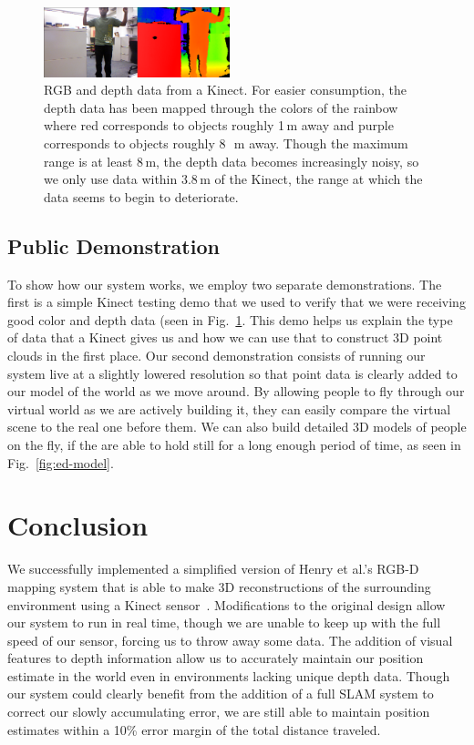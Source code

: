 \documentclass[letterpaper, 10pt, conference]{ieeeconf}
\begin{document}
\begin{figure}
\centering
\includegraphics[width=0.48\textwidth]{figures/KinectDemo.png}
\caption{RGB and depth data from a Kinect. For easier consumption, the depth
data has been mapped through the colors of the rainbow where red corresponds
to objects roughly 1\,m away and purple corresponds to objects roughly 8~\,m
away. Though the maximum range is at least 8\,m, the depth data
becomes increasingly noisy, so we only use data within 3.8\,m of the Kinect,
the range at which the data seems to begin to deteriorate.}
\label{fig:kinect-demo}
\end{figure}

\subsection{Public Demonstration}
To show how our system works, we employ two separate demonstrations. The first
is a simple Kinect testing demo that we used to verify that we were receiving
good color and depth data (seen in Fig.~\ref{fig:kinect-demo}. This demo helps
us explain the type of data that a Kinect gives us and how we can use that to
construct 3D point clouds in the first place. Our second demonstration
consists of running our system live at a slightly lowered resolution so that
point data is clearly added to our model of the world as we move around. By
allowing people to fly through our virtual world as we are actively building
it, they can easily compare the virtual scene to the real one before them. We
can also build detailed 3D models of people on the fly, if the are able to
hold still for a long enough period of time, as seen in Fig.~\ref{fig:ed-model}.

\section{Conclusion}
We successfully implemented a simplified version of Henry et al.'s RGB-D mapping
system that is able to make 3D reconstructions of the surrounding environment
using a Kinect sensor~\cite{Henry2010rgbd}. Modifications to the original
design allow our system to run in real time, though we are unable to keep up with
the full speed of our sensor, forcing us to throw away some data. The addition of
visual features to depth information allow us to accurately maintain our position
estimate in the world even in environments lacking unique depth data. Though our
system could clearly benefit from the addition of a full SLAM system to
correct our slowly accumulating error, we are still able to maintain position
estimates within a 10\% error margin of the total distance traveled. %
\end{document}
